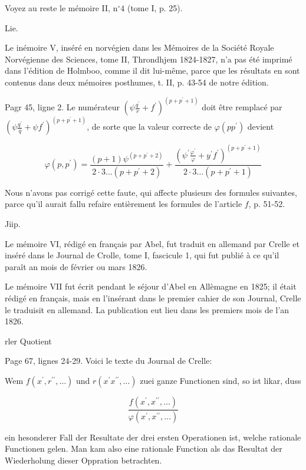 \documentclass{article}
\begin{document}
Voyez au reste le mémoire II, \(\mathrm{n}^{\circ} 4\) (tome I, p. 25).

Lie.

Le inémoire V, inséré en norvégien dans les Mémoires de la Société Royale Norvégienne des Sciences, tome II, Throndhjem 1824-1827, n'a pas été imprimé dans l'édition de Holmboo, comme il dit lui-même, parce que les résultats en sont contenus dans deux mémoires posthumes, t. II, p. 43-54 de notre édition.

Pagr 45, ligne 2. Le numérateur \(\left(\psi \frac{q^{\prime}}{r}+f^{\prime}\right)^{\left(p+p^{\prime}+1\right)}\) doit être remplacé par \(\left(\psi \frac{q^{\prime}}{q}+\psi f^{\prime}\right)^{\left(p+p^{\prime}+1\right)}\), de sorte que la valeur correcte de \(\varphi\left(p p^{\prime}\right)\) devient

\[
\varphi\left(p, p^{\prime}\right)=\frac{(p+1) \psi^{\left(p+p^{\prime}+2\right)}}{2 \cdot 3 \ldots\left(p+p^{\prime}+2\right)}+\frac{\left(\psi^{\prime} \frac{\varphi^{\prime}}{\varphi}+y^{\prime} f^{\prime}\right)^{\left(p+p^{\prime}+1\right)}}{2 \cdot 3 \ldots\left(p+p^{\prime}+1\right)}
\]

Nous n'avons pas corrigé cette faute, qui affecte plusieurs des formules suivantes, parce qu'il aurait fallu refaire entièrement les formules de l'article \(f\), p. 51-52.

Jiip.

Le mémoire VI, rédigé en français par Abel, fut traduit en allemand par Crelle et inséré dans le Journal de Crolle, tome I, fascicule 1, qui fut publié à ce qu'il paraît an mois de février ou mars 1826.

Le mémoire VII fut écrit pendant le séjour d'Abel en Allèmagne en 1825; il était rédigé en français, mais en l'insérant dans le premier cahier de son Journal, Crelle le traduisit en allemand. La publication eut lieu dans les premiers mois de l'an 1826.

rler Quotient

Page 67, lignes 24-29. Voici le texte du Journal de Crelle:

Wem \(f\left(x^{\prime}, r^{\prime \prime}, \ldots\right)\) und \(r\left(x^{\prime} x^{\prime \prime}, \ldots\right)\) zuei ganze Functionen sind, so ist likar, duss

\[
\frac{f\left(x^{\prime}, x^{\prime \prime}, \ldots\right)}{\varphi\left(x^{\prime}, x^{\prime \prime}, \ldots\right)}
\]

ein hesonderer Fall der Resultate der drei ersten Operationen ist, welche rationale Functionen gelen. Man kam also eine rationale Function als das Resultat der Wiederholung dieser Oppration betrachten.
\end{document}
